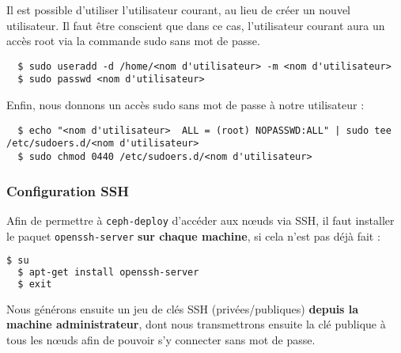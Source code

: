 \begin{WarningBox}
Il est possible d'utiliser l'utilisateur courant, au lieu de créer un nouvel utilisateur. Il faut être conscient que dans ce cas, l'utilisateur courant aura un accès root via la commande sudo sans mot de passe.
\end{WarningBox}

\vspace{3mm}
\begin{lstlisting}
  $ sudo useradd -d /home/<nom d'utilisateur> -m <nom d'utilisateur>
  $ sudo passwd <nom d'utilisateur>
\end{lstlisting}

Enfin, nous donnons un accès sudo sans mot de passe à notre utilisateur :

\vspace{3mm}
\begin{lstlisting}
  $ echo "<nom d'utilisateur>  ALL = (root) NOPASSWD:ALL" | sudo tee /etc/sudoers.d/<nom d'utilisateur>
  $ sudo chmod 0440 /etc/sudoers.d/<nom d'utilisateur> 
\end{lstlisting}


\subsubsection{Configuration SSH}

Afin de permettre à \verb|ceph-deploy| d'accéder aux nœuds via SSH, il faut installer le paquet \verb|openssh-server| \textbf{sur chaque machine}, si cela n'est pas déjà fait :

\vspace{3mm}
\begin{lstlisting}[language=bash]
  $ su
  $ apt-get install openssh-server
  $ exit
\end{lstlisting}

Nous générons ensuite un jeu de clés SSH (privées/publiques) \textbf{depuis la machine administrateur}, dont nous transmettrons ensuite la clé publique à tous les nœuds afin de pouvoir s'y connecter sans mot de passe.

